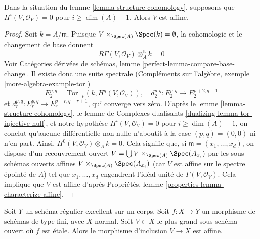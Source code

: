 \begin{lemma}
\label{lemma-conclude}
Dans la situation du lemme \ref{lemma-structure-cohomology},
supposons que $H^i(V, \mathcal{O}_V) = 0$ pour $i \geq \dim(A) - 1$.
Alors $V$ est affine.
\end{lemma}

\begin{proof}
Soit $k = A/\mathfrak m$. Puisque $V \times_{\Spec(A)} \Spec(k) = \emptyset$,
la cohomologie et le changement de base donnent
$$
R\Gamma(V, \mathcal{O}_V) \otimes_A^\mathbf{L} k = 0
$$
Voir
Catégories dérivées de schémas, lemme \ref{perfect-lemma-compare-base-change}.
Il existe donc une suite spectrale
(Compléments sur l'algèbre, exemple \ref{more-algebra-example-tor})
$$
E_2^{p, q} = \text{Tor}_{-p}(k, H^q(V, \mathcal{O}_V)),\quad
d_2^{p, q} : E_2^{p, q} \to E_2^{p + 2, q - 1}
$$
et $d_r^{p, q} : E_r^{p, q} \to E_r^{p + r, q - r + 1}$,
qui converge vers zéro. D'après le lemme \ref{lemma-structure-cohomology},
le lemme de Complexes dualisants \ref{dualizing-lemma-tor-injective-hull},
et notre hypothèse $H^i(V, \mathcal{O}_V) = 0$ pour $i \geq \dim(A) - 1$,
on conclut qu'aucune différentielle non nulle
n'aboutit à la case $(p, q) = (0, 0)$ ni n'en part. Ainsi,
$H^0(V, \mathcal{O}_V) \otimes_A k = 0$. Cela signifie que,
si $\mathfrak m = (x_1, \ldots, x_d)$, on dispose
d'un recouvrement ouvert $V = \bigcup V \times_{\Spec(A)} \Spec(A_{x_i})$
par les sous-schémas ouverts affines $V \times_{\Spec(A)} \Spec(A_{x_i})$
(car $V$ est affine sur le spectre épointé de $A$)
tel que $x_1, \ldots, x_d$ engendrent
l'idéal unité de $\Gamma(V, \mathcal{O}_V)$.
Cela implique que $V$ est affine d'après
Propriétés, lemme \ref{properties-lemma-characterize-affine}.
\end{proof}

\begin{theorem}
\label{theorem-global}
Soit $Y$ un schéma régulier excellent sur un corps. Soit $f : X \to Y$
un morphisme de schémas de type fini, avec $X$ normal. Soit $V \subset X$
le plus grand sous-schéma ouvert où $f$ est \'etale. Alors le morphisme
d'inclusion $V \to X$ est affine.
\end{theorem}


